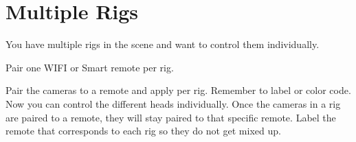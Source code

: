 \chapter{Multiple Rigs}
\pagecolor{white}
\label{chap:10}
\begin{fullwidth}


\problem

{\large You have multiple rigs in the scene and want to control them individually. \par}

\solution

{\large Pair one WIFI or Smart remote per rig. \par}

Pair the cameras to a remote and apply per rig. Remember to label or color code. Now you can control the different heads individually. Once the cameras in a rig are paired to a remote, they will stay paired to that specific remote. Label the remote that corresponds to each rig so they do not get mixed up. 





\clearpage
\end{fullwidth}
